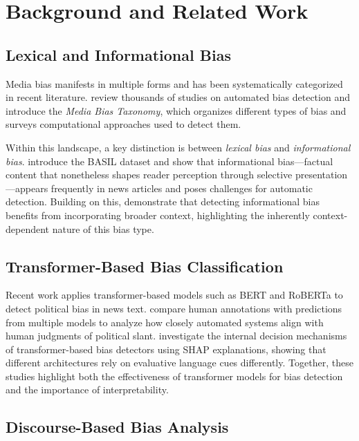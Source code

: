 \documentclass[11pt]{article}
\begin{document}
\section{Background and Related Work}

\subsection{Lexical and Informational Bias}

Media bias manifests in multiple forms and has been systematically categorized in recent literature. \citet{spinde2024mediabiastaxonomysystematic} review thousands of studies on automated bias detection and introduce the \emph{Media Bias Taxonomy}, which organizes different types of bias and surveys computational approaches used to detect them.

Within this landscape, a key distinction is between \emph{lexical bias} and \emph{informational bias}. \citet{fan2019plainsightmediabias} introduce the BASIL dataset and show that informational bias---factual content that nonetheless shapes reader perception through selective presentation---appears frequently in news articles and poses challenges for automatic detection. Building on this, \citet{berg2020contextinformationalbiasdetection} demonstrate that detecting informational bias benefits from incorporating broader context, highlighting the inherently context-dependent nature of this bias type.

\subsection{Transformer-Based Bias Classification}

Recent work applies transformer-based models such as BERT and RoBERTa to detect political bias in news text. \citet{banik2025bridginghumanmodelperspectives} compare human annotations with predictions from multiple models to analyze how closely automated systems align with human judgments of political slant. \citet{ghosh2025explainingnewsbiasdetection} investigate the internal decision mechanisms of transformer-based bias detectors using SHAP explanations, showing that different architectures rely on evaluative language cues differently. Together, these studies highlight both the effectiveness of transformer models for bias detection and the importance of interpretability.

\subsection{Discourse-Based Bias Analysis}
\end{document}
